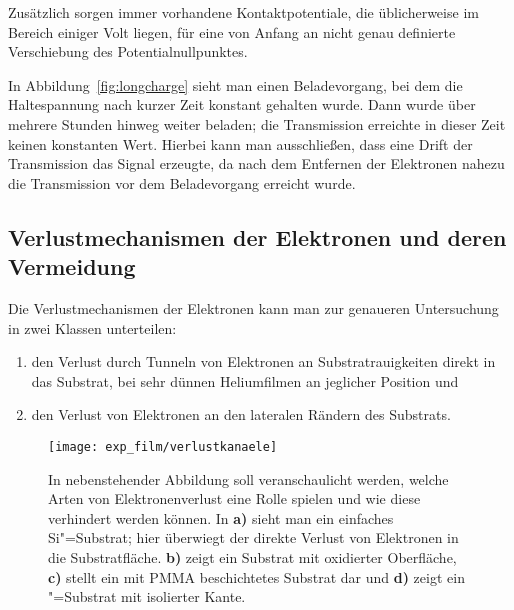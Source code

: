 Zusätzlich sorgen immer vorhandene Kontaktpotentiale, die üblicherweise im Bereich einiger Volt liegen, für eine von Anfang an nicht genau definierte Verschiebung des Potentialnullpunktes.

In Abbildung~\ref{fig:longcharge} sieht man einen Beladevorgang, bei dem die Haltespannung nach kurzer Zeit konstant gehalten wurde. Dann wurde über mehrere Stunden hinweg weiter beladen; die Transmission erreichte in dieser Zeit keinen konstanten Wert. Hierbei kann man ausschließen, dass eine Drift der Transmission das Signal erzeugte, da nach dem Entfernen der Elektronen nahezu die Transmission vor dem Beladevorgang erreicht wurde. 
     
\subsection{Verlustmechanismen der Elektronen und deren Vermeidung}
\enlargethispage{\baselineskip}
\label{ssec:elektronenverlust}
Die Verlustmechanismen der Elektronen kann man zur genaueren Untersuchung in zwei Klassen unterteilen:

\begin{enumerate}
    \item den Verlust durch Tunneln von Elektronen an Substratrauigkeiten direkt in das Substrat, bei sehr dünnen Heliumfilmen an jeglicher Position und
    \item den Verlust von Elektronen an den lateralen Rändern des Substrats.
\end{enumerate}

\begin{figure}[h!tb]
    \texttt{[image: exp\_film/verlustkanaele]}%
    \hfill%
    \begin{minipage}[b]{\textwidth-\midwidth-\tabcolsep}
        \caption[Verhinderung von Elektronenverlust]{In nebenstehender Abbildung soll veranschaulicht werden, welche Arten von Elektronenverlust eine Rolle spielen und wie diese verhindert werden können. In {\bfseries a)} sieht man ein einfaches Si"=Substrat; hier überwiegt der direkte Verlust von Elektronen in die Substratfläche. {\bfseries b)} zeigt ein Substrat mit oxidierter Oberfläche, {\bfseries c)} stellt ein mit PMMA beschichtetes Substrat dar und {\bfseries d)} zeigt ein \SiO"=Substrat mit isolierter Kante.}
		\label{fig:e_verlust}
    \end{minipage}
\end{figure}

